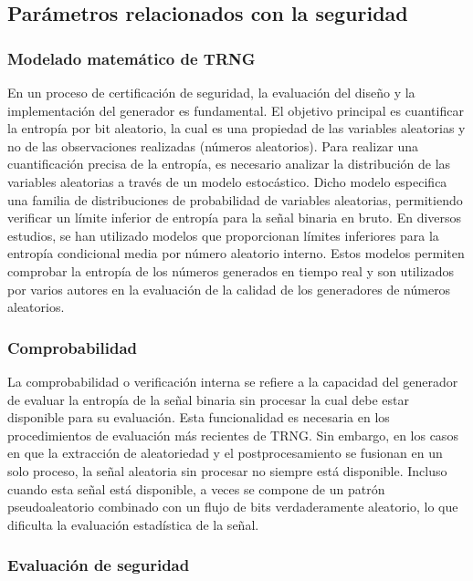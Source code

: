         \subsection{Parámetros relacionados con la seguridad}

            \subsubsection{Modelado matemático de TRNG}
            
            En un proceso de certificación de seguridad, la evaluación del diseño y la implementación del generador es fundamental. El objetivo principal es cuantificar la entropía por bit aleatorio, la cual es una propiedad de las variables aleatorias y no de las observaciones realizadas (números aleatorios). Para realizar una cuantificación precisa de la entropía, es necesario analizar la distribución de las variables aleatorias a través de un modelo estocástico. Dicho modelo especifica una familia de distribuciones de probabilidad de variables aleatorias, permitiendo verificar un límite inferior de entropía para la señal binaria en bruto. En diversos estudios, se han utilizado modelos que proporcionan límites inferiores para la entropía condicional media por número aleatorio interno. Estos modelos permiten comprobar la entropía de los números generados en tiempo real y son utilizados por varios autores en la evaluación de la calidad de los generadores de números aleatorios.

            \subsubsection{Comprobabilidad}

            La comprobabilidad o verificación interna se refiere a la capacidad del generador de evaluar la entropía de la señal binaria sin procesar la cual debe estar disponible para su evaluación. Esta funcionalidad es necesaria en los procedimientos de evaluación más recientes de TRNG. Sin embargo, en los casos en que la extracción de aleatoriedad y el postprocesamiento se fusionan en un solo proceso, la señal aleatoria sin procesar no siempre está disponible. Incluso cuando esta señal está disponible, a veces se compone de un patrón pseudoaleatorio combinado con un flujo de bits verdaderamente aleatorio, lo que dificulta la evaluación estadística de la señal. 

            \subsubsection{Evaluación de seguridad}

